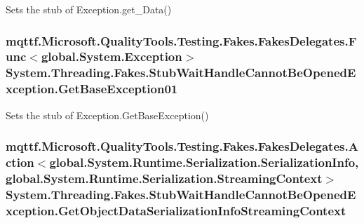 Sets the stub of Exception.\-get\-\_\-\-Data()

\hypertarget{class_system_1_1_threading_1_1_fakes_1_1_stub_wait_handle_cannot_be_opened_exception_ad5431cd2ffc8d278086121f9e60ccbd0}{
\subsubsection[{Get\-Base\-Exception01}]{\setlength{\rightskip}{0pt plus 5cm}mqttf.\-Microsoft.\-Quality\-Tools.\-Testing.\-Fakes.\-Fakes\-Delegates.\-Func$<$global.\-System.\-Exception$>$ System.\-Threading.\-Fakes.\-Stub\-Wait\-Handle\-Cannot\-Be\-Opened\-Exception.\-Get\-Base\-Exception01}}\label{class_system_1_1_threading_1_1_fakes_1_1_stub_wait_handle_cannot_be_opened_exception_ad5431cd2ffc8d278086121f9e60ccbd0}


Sets the stub of Exception.\-Get\-Base\-Exception()

\hypertarget{class_system_1_1_threading_1_1_fakes_1_1_stub_wait_handle_cannot_be_opened_exception_ada805af5593f50fff692d909fd3bbcae}{
\subsubsection[{Get\-Object\-Data\-Serialization\-Info\-Streaming\-Context}]{\setlength{\rightskip}{0pt plus 5cm}mqttf.\-Microsoft.\-Quality\-Tools.\-Testing.\-Fakes.\-Fakes\-Delegates.\-Action$<$global.\-System.\-Runtime.\-Serialization.\-Serialization\-Info, global.\-System.\-Runtime.\-Serialization.\-Streaming\-Context$>$ System.\-Threading.\-Fakes.\-Stub\-Wait\-Handle\-Cannot\-Be\-Opened\-Exception.\-Get\-Object\-Data\-Serialization\-Info\-Streaming\-Context}}\label{class_system_1_1_threading_1_1_fakes_1_1_stub_wait_handle_cannot_be_opened_exception_ada805af5593f50fff692d909fd3bbcae}


